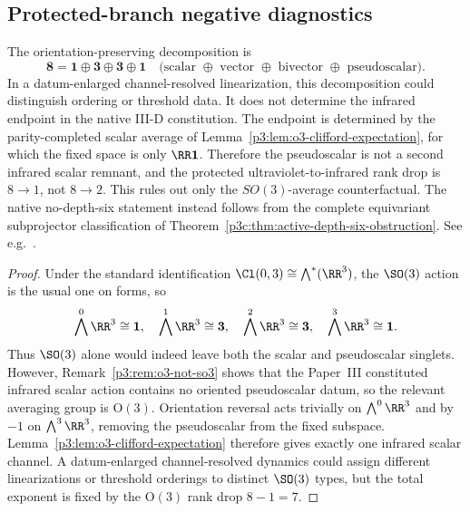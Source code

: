 \documentclass[11pt,a4paper]{article}
\begin{document}
\subsection{Protected-branch negative diagnostics}
\label{p3d:app:protected-diagnostics}
\begin{corollary}
\label{p3:cor:so3-pseudoscalar-objection}
\leavevmode\par\noindent
The orientation-preserving decomposition is
\begin{equation}
\mathbf{8}
=
\mathbf{1}\oplus\mathbf{3}\oplus\mathbf{3}\oplus\mathbf{1}
\quad
\text{(scalar \(\oplus\) vector \(\oplus\) bivector \(\oplus\) pseudoscalar)}.
\end{equation}
In a datum-enlarged channel-resolved linearization, this decomposition could
distinguish ordering or threshold data.  It does not determine the infrared
endpoint in the native III-D constitution.
The endpoint is determined by the parity-completed scalar average of
Lemma~\ref{p3:lem:o3-clifford-expectation}, for which the fixed space is only
\(\RR\mathbf 1\).  Therefore the pseudoscalar is not a second infrared scalar
remnant, and the protected ultraviolet-to-infrared rank drop is \(8\to 1\), not
\(8\to 2\).  This rules out only the \(SO(3)\)-average counterfactual.  The
native no-depth-six statement instead follows from the complete equivariant
subprojector classification of
Theorem~\ref{p3c:thm:active-depth-six-obstruction}.  See e.g.\
\cite{Hall2015lie,fulton1991representation}.
\end{corollary}

\begin{proof}
Under the standard identification $\Cl(0,3)\cong \bigwedge^*(\RR^3)$, the $\SO(3)$ action is the
usual one on forms, so
\[
\bigwedge^0\RR^3\cong \mathbf 1,\quad
\bigwedge^1\RR^3\cong \mathbf 3,\quad
\bigwedge^2\RR^3\cong \mathbf 3,\quad
\bigwedge^3\RR^3\cong \mathbf 1.
\]
Thus $\SO(3)$ alone would indeed leave both the scalar and pseudoscalar singlets.  However,
Remark~\ref{p3:rem:o3-not-so3} shows that the Paper~III constituted infrared scalar action contains no
oriented pseudoscalar datum, so the relevant averaging group is $\mathrm O(3)$.  Orientation reversal
acts trivially on \(\bigwedge^0\RR^3\) and by $-1$ on \(\bigwedge^3\RR^3\), removing the
pseudoscalar from the fixed subspace.  Lemma~\ref{p3:lem:o3-clifford-expectation} therefore gives
exactly one infrared scalar channel.  A datum-enlarged channel-resolved dynamics could assign different
linearizations or threshold orderings to distinct $\SO(3)$ types, but the total exponent is fixed
by the $\mathrm O(3)$ rank drop \(8-1=7\).
\end{proof}
\end{document}
